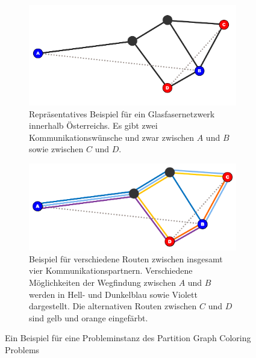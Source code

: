\begin{figure}
	\centering
	\begin{subfigure}{\textwidth}
		\includegraphics{img/bsp1}
		\caption{Repräsentatives Beispiel für ein Glasfasernetzwerk innerhalb Österreichs. Es gibt zwei Kommunikationswünsche und zwar zwischen $A$ und $B$ sowie zwischen $C$ und $D$.}
		\label{fig:example:a}
	\end{subfigure}
	\begin{subfigure}{\textwidth}
		\includegraphics{img/bsp2}
		\caption{Beispiel für verschiedene Routen zwischen insgesamt vier Kommunikationspartnern. Verschiedene Möglichkeiten der Wegfindung zwischen $A$ und $B$ werden in Hell- und Dunkelblau sowie Violett dargestellt. Die alternativen Routen zwischen $C$ und $D$ sind gelb und orange eingefärbt.}
		\label{fig:example:b}
	\end{subfigure}
	\caption{Ein Beispiel für eine Probleminstanz des Partition Graph Coloring Problems}
	\label{fix:example}
\end{figure}


